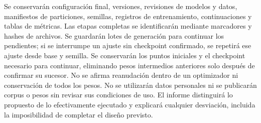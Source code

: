\documentclass[12pt,letterpaper]{article}
\begin{document}
Se conservarán configuración final, versiones, revisiones de modelos y
datos, manifiestos de particiones, semillas, registros de entrenamiento,
continuaciones y tablas de métricas. Las etapas completas se identificarán
mediante marcadores y hashes de archivos. Se guardarán lotes de generación
para continuar los pendientes; si se interrumpe un ajuste sin checkpoint
confirmado, se repetirá ese ajuste desde base y semilla. Se conservarán los
puntos iniciales y el checkpoint necesario para continuar, eliminando pesos
intermedios anteriores solo después de confirmar su sucesor. No se afirma
reanudación dentro de un optimizador ni conservación de todos los pesos.
No se utilizarán datos personales ni
se publicarán corpus o pesos sin revisar sus condiciones de uso. El informe
distinguirá lo propuesto de lo efectivamente ejecutado y explicará cualquier
desviación, incluida la imposibilidad de completar el diseño previsto.

\end{document}
